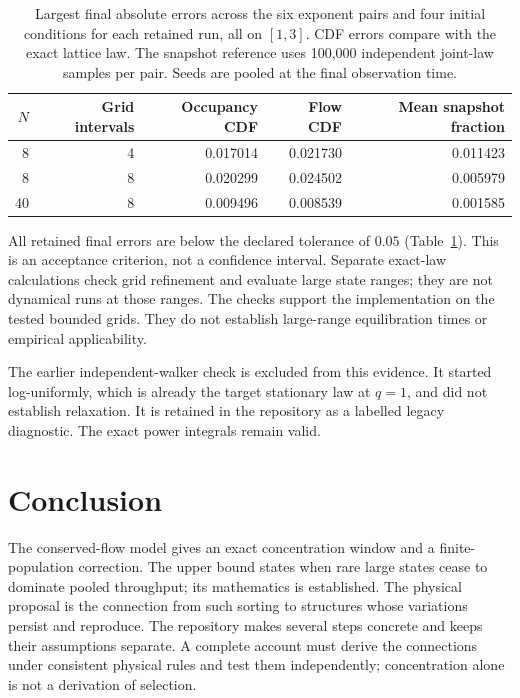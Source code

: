 \documentclass[11pt,a4paper]{article}
\begin{document}
\begin{table}[!ht]
\centering
\begin{tabular}{rrrrr}
\toprule
$N$ & Grid intervals & Occupancy CDF & Flow CDF & Mean snapshot fraction\\
\midrule
8 & 4 & 0.017014 & 0.021730 & 0.011423\\
8 & 8 & 0.020299 & 0.024502 & 0.005979\\
40 & 8 & 0.009496 & 0.008539 & 0.001585\\
\bottomrule
\end{tabular}
\caption{Largest final absolute errors across the six exponent pairs and four
initial conditions for each retained run, all on $[1,3]$. CDF errors compare
with the exact lattice law. The snapshot reference uses 100,000 independent
joint-law samples per pair. Seeds are pooled at the final observation time.}
\label{tab:checks}
\end{table}

All retained final errors are below the declared tolerance of $0.05$
(Table~\ref{tab:checks}). This is an acceptance criterion, not a confidence
interval. Separate exact-law calculations check grid refinement and evaluate
large state ranges; they are not dynamical runs at those ranges. The checks
support the implementation on the tested bounded grids. They do not establish
large-range equilibration times or empirical applicability.

The earlier independent-walker check is excluded from this evidence. It started
log-uniformly, which is already the target stationary law at $q=1$, and did not
establish relaxation. It is retained in the repository as a labelled legacy
diagnostic. The exact power integrals remain valid.

\section{Conclusion}

The conserved-flow model gives an exact concentration window and a
finite-population correction. The upper bound states when rare large states
cease to dominate pooled throughput; its mathematics is established. The
physical proposal is the connection from such sorting to structures whose
variations persist and reproduce. The repository makes several steps concrete
and keeps their assumptions separate. A complete account must derive the
connections under consistent physical rules and test them independently;
concentration alone is not a derivation of selection.
\end{document}
